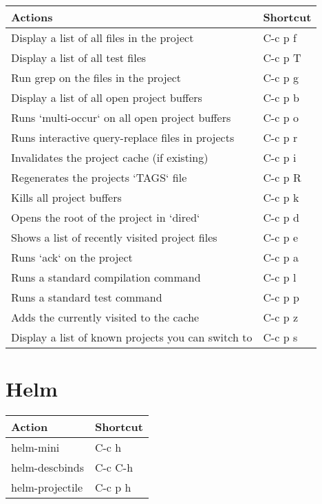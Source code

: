 \documentclass[english]{rcalibrionecolumn}
\begin{document}
\begin{center}
\begin{tabular}{ll}
 \textbf{Actions}                                    &  \textbf{Shortcut}  \\
\hline
 Display a list of all files in the project          &  C-c p f            \\
 Display a list of all test files                    &  C-c p T            \\
 Run grep on the files in the project                &  C-c p g            \\
 Display a list of all open project buffers          &  C-c p b            \\
 Runs `multi-occur` on all open project buffers      &  C-c p o            \\
 Runs interactive query-replace  files in  projects  &  C-c p r            \\
 Invalidates the project cache (if existing)         &  C-c p i            \\
 Regenerates the projects `TAGS` file                &  C-c p R            \\
 Kills all project buffers                           &  C-c p k            \\
 Opens the root of the project in `dired`            &  C-c p d            \\
 Shows a list of recently visited project files      &  C-c p e            \\
 Runs `ack` on the project                           &  C-c p a            \\
 Runs a standard compilation command                 &  C-c p l            \\
 Runs a standard test command                        &  C-c p p            \\
 Adds the currently visited to the cache             &  C-c p z            \\
 Display a list of known projects you can switch to  &  C-c p s            \\
\end{tabular}
\end{center}
\section{Helm}
\label{sec-7}


\begin{center}
\begin{tabular}{ll}
 \textbf{Action}  &  \textbf{Shortcut}  \\
\hline
 helm-mini        &  C-c h              \\
 helm-descbinds   &  C-c C-h            \\
 helm-projectile  &  C-c p h            \\
\end{tabular}
\end{center}
\end{document}
